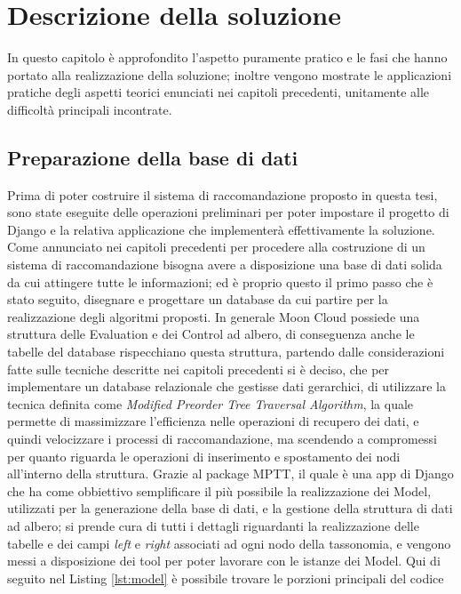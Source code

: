 \chapter{Descrizione della soluzione}\label{chp:04-solution}
In questo capitolo è approfondito l'aspetto puramente pratico e le fasi che hanno portato alla realizzazione della soluzione; 
inoltre vengono mostrate le applicazioni pratiche degli aspetti teorici enunciati nei capitoli precedenti, unitamente alle difficoltà 
principali incontrate.
\section*{Preparazione della base di dati}
Prima di poter costruire il sistema di raccomandazione proposto in questa tesi, sono state eseguite delle operazioni preliminari 
per poter impostare il progetto di Django e la relativa applicazione che implementerà effettivamente la soluzione.
%
Come annunciato nei capitoli precedenti per procedere alla costruzione di un sistema di raccomandazione bisogna avere a disposizione 
una base di dati solida da cui attingere tutte le informazioni; ed è proprio questo il primo passo che è stato seguito, disegnare 
e progettare un database da cui partire per la realizzazione degli algoritmi proposti.
In generale Moon Cloud possiede una struttura delle Evaluation e dei Control ad albero, di conseguenza anche le tabelle del database 
rispecchiano questa struttura, partendo dalle considerazioni fatte sulle tecniche descritte nei capitoli precedenti si è deciso, che 
per implementare un database relazionale che gestisse dati gerarchici, di utilizzare la tecnica
definita come \textit{Modified Preorder Tree Traversal Algorithm}, la quale permette di massimizzare l'efficienza nelle 
operazioni di recupero dei dati, e quindi velocizzare i processi di raccomandazione, ma scendendo a compromessi per quanto riguarda le 
operazioni di inserimento e spostamento dei nodi all'interno della struttura. 
Grazie al package MPTT, il quale è una app di Django che ha come obbiettivo semplificare il più possibile la realizzazione dei 
Model, utilizzati per la generazione della base di dati, e la 
gestione della struttura di dati ad albero; si prende cura di tutti i dettagli riguardanti la realizzazione delle tabelle e dei 
campi \textit{left} e \textit{right} associati ad ogni nodo della tassonomia, e vengono messi a disposizione dei tool per poter 
lavorare con le istanze dei Model. Qui di seguito nel Listing \ref{lst:model} è possibile trovare le porzioni principali del codice 
